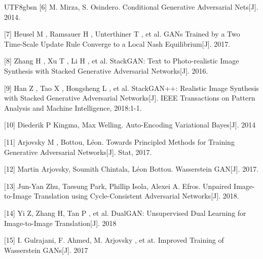 \documentclass{article}
\begin{document}
\begin{CJK*}{UTF8}{gbsn}
[6] M. Mirza, S. Osindero. Conditional Generative Adversarial Nets[J]. 2014.

[7] Heusel M , Ramsauer H , Unterthiner T , et al. GANs Trained by a Two Time-Scale Update Rule Converge to a Local Nash Equilibrium[J]. 2017.

[8] Zhang H , Xu T , Li H , et al. StackGAN: Text to Photo-realistic Image Synthesis with Stacked Generative Adversarial Networks[J]. 2016.

[9] Han Z , Tao X , Hongsheng L , et al. StackGAN++: Realistic Image Synthesis with Stacked Generative Adversarial Networks[J]. IEEE Transactions on Pattern Analysis and Machine Intelligence, 2018:1-1.

[10] Diederik P Kingma, Max Welling. Auto-Encoding Variational Bayes[J]. 2014

[11] Arjovsky M , Bottou, L\'{e}on. Towards Principled Methods for Training Generative Adversarial Networks[J]. Stat, 2017.

[12] Martin Arjovsky, Soumith Chintala, L\'{e}on Bottou. Wasserstein GAN[J]. 2017.

[13] Jun-Yan Zhu, Taesung Park, Phillip Isola, Alexei A. Efros. Unpaired Image-to-Image Translation using Cycle-Consistent Adversarial Networks[J]. 2018.

[14] Yi Z, Zhang H, Tan P , et al. DualGAN: Unsupervised Dual Learning for Image-to-Image Translation[J]. 2018

[15] I. Gulrajani, F. Ahmed, M. Arjovsky , et at. Improved Training of Wasserstein GANs[J]. 2017

\end{CJK*}
\end{document}
